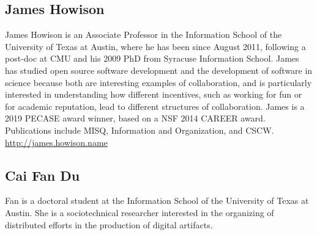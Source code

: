 \documentclass[sigchi-a,screen]{acmart}
\begin{document}
\subsection{James Howison}
James Howison is an Associate Professor in the Information School of the University of Texas at Austin, where he has been since August 2011, following a post-doc at CMU and his 2009 PhD from Syracuse Information School. James has studied open source software development and the development of software in science because both are interesting examples of collaboration, and is particularly interested in understanding how different incentives, such as working for fun or for academic reputation, lead to different structures of collaboration. James is a 2019 PECASE award winner, based on a NSF 2014 CAREER award. Publications include MISQ, Information and Organization, and CSCW. \href{http://james.howison.name}{http://james.howison.name}

\subsection{Cai Fan Du}
Fan is a doctoral student at the Information School of the University of Texas at Austin. She is a sociotechnical researcher interested in the organizing of distributed efforts in the production of digital artifacts. 
\end{document}

